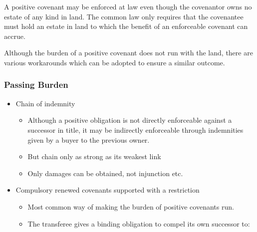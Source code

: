 \documentclass[
]{article}
\providecommand{\tightlist}{%
  \setlength{\itemsep}{0pt}\setlength{\parskip}{0pt}}
\begin{document}
A positive covenant may be enforced at law even though the covenantor
owns no estate of any kind in land. The common law only requires that
the covenantee must hold an estate in land to which the benefit of an
enforceable covenant can accrue.

Although the burden of a positive covenant does not run with the land,
there are various workarounds which can be adopted to ensure a similar
outcome.

\hypertarget{passing-burden}{%
\subsubsection{Passing Burden}\label{passing-burden}}

\begin{itemize}
\tightlist
\item
  Chain of indemnity

  \begin{itemize}
  \tightlist
  \item
    Although a positive obligation is not directly enforceable against a
    successor in title, it may be indirectly enforceable through
    indemnities given by a buyer to the previous owner.
  \item
    But chain only as strong as its weakest link
  \item
    Only damages can be obtained, not injunction etc.
  \end{itemize}
\item
  Compulsory renewed covenants supported with a restriction

  \begin{itemize}
  \tightlist
  \item
    Most common way of making the burden of positive covenants run.
  \item
    The transferee gives a binding obligation to compel its own
    successor to:


\end{itemize}
\end{itemize}
\end{document}
